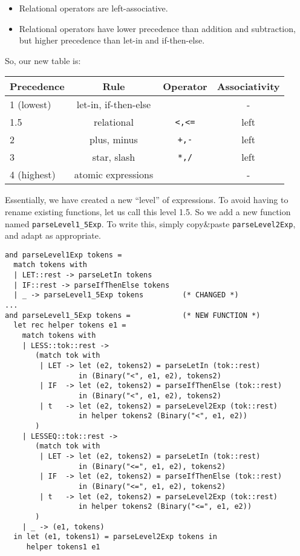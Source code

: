 \documentclass[addpoints]{exam}
\begin{document}
\begin{questions}
\begin{solution}
    \begin{itemize}
    \item Relational operators are left-associative.
    \item Relational operators have lower precedence than addition and subtraction,
      but higher precedence than let-in and if-then-else.
    \end{itemize}

    So, our new table is:

    \begin{center}
      \begin{tabular}{|l|c|c|c|}
        \hline
        Precedence & Rule & Operator & Associativity \\\hline\hline
        1 (lowest)  & let-in, if-then-else &  & - \\\hline
        1.5           & relational & \texttt{<,<=} & left\\\hline
        2           & plus, minus & \texttt{+,-} & left\\\hline
        3           & star, slash & \texttt{*,/} & left\\\hline
        4 (highest) & atomic expressions &              & -\\\hline
      \end{tabular}
    \end{center}

    Essentially, we have created a new ``level'' of expressions.
    To avoid having to rename existing functions, let us call this level 1.5.
    So we add a new function named \texttt{parseLevel1\_5Exp}.
    To write this, simply copy\&paste \texttt{parseLevel2Exp},
    and adapt as appropriate.
    
    {\small
    \begin{verbatim}      
and parseLevel1Exp tokens =
  match tokens with
  | LET::rest -> parseLetIn tokens
  | IF::rest -> parseIfThenElse tokens
  | _ -> parseLevel1_5Exp tokens         (* CHANGED *)
...
and parseLevel1_5Exp tokens =            (* NEW FUNCTION *)
  let rec helper tokens e1 =
    match tokens with
    | LESS::tok::rest ->
       (match tok with
        | LET -> let (e2, tokens2) = parseLetIn (tok::rest)
                 in (Binary("<", e1, e2), tokens2)
        | IF  -> let (e2, tokens2) = parseIfThenElse (tok::rest)
                 in (Binary("<", e1, e2), tokens2)
        | t   -> let (e2, tokens2) = parseLevel2Exp (tok::rest)
                 in helper tokens2 (Binary("<", e1, e2))
       )
    | LESSEQ::tok::rest ->
       (match tok with
        | LET -> let (e2, tokens2) = parseLetIn (tok::rest)
                 in (Binary("<=", e1, e2), tokens2)
        | IF  -> let (e2, tokens2) = parseIfThenElse (tok::rest)
                 in (Binary("<=", e1, e2), tokens2)
        | t   -> let (e2, tokens2) = parseLevel2Exp (tok::rest)
                 in helper tokens2 (Binary("<=", e1, e2))
       )
    | _ -> (e1, tokens)
  in let (e1, tokens1) = parseLevel2Exp tokens in
     helper tokens1 e1
    \end{verbatim}
    }


\end{solution}
\end{questions}
\end{document}
